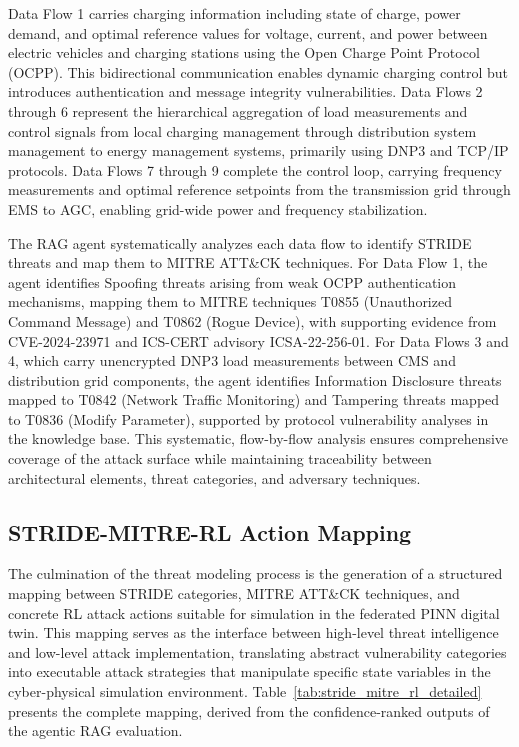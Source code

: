 Data Flow 1 carries charging information including state of charge, power demand, and optimal reference values for voltage, current, and power between electric vehicles and charging stations using the Open Charge Point Protocol (OCPP). This bidirectional communication enables dynamic charging control but introduces authentication and message integrity vulnerabilities. Data Flows 2 through 6 represent the hierarchical aggregation of load measurements and control signals from local charging management through distribution system management to energy management systems, primarily using DNP3 and TCP/IP protocols. Data Flows 7 through 9 complete the control loop, carrying frequency measurements and optimal reference setpoints from the transmission grid through EMS to AGC, enabling grid-wide power and frequency stabilization.

The RAG agent systematically analyzes each data flow to identify STRIDE threats and map them to MITRE ATT\&CK techniques. For Data Flow 1, the agent identifies Spoofing threats arising from weak OCPP authentication mechanisms, mapping them to MITRE techniques T0855 (Unauthorized Command Message) and T0862 (Rogue Device), with supporting evidence from CVE-2024-23971 and ICS-CERT advisory ICSA-22-256-01. For Data Flows 3 and 4, which carry unencrypted DNP3 load measurements between CMS and distribution grid components, the agent identifies Information Disclosure threats mapped to T0842 (Network Traffic Monitoring) and Tampering threats mapped to T0836 (Modify Parameter), supported by protocol vulnerability analyses in the knowledge base. This systematic, flow-by-flow analysis ensures comprehensive coverage of the attack surface while maintaining traceability between architectural elements, threat categories, and adversary techniques.

\subsection{STRIDE-MITRE-RL Action Mapping}

The culmination of the threat modeling process is the generation of a structured mapping between STRIDE categories, MITRE ATT\&CK techniques, and concrete RL attack actions suitable for simulation in the federated PINN digital twin. This mapping serves as the interface between high-level threat intelligence and low-level attack implementation, translating abstract vulnerability categories into executable attack strategies that manipulate specific state variables in the cyber-physical simulation environment. Table~\ref{tab:stride_mitre_rl_detailed} presents the complete mapping, derived from the confidence-ranked outputs of the agentic RAG evaluation.

